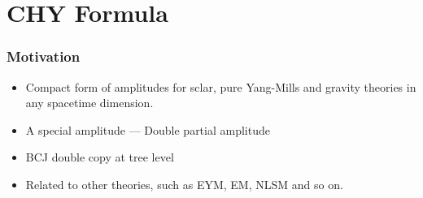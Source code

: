 \documentclass{beamer}
\begin{document}
\section{CHY Formula}
\begin{frame}
    \frametitle{Motivation}
    \begin{itemize}
        \item Compact form of amplitudes for sclar, pure Yang-Mills and gravity theories in any spacetime dimension.
        \item A special amplitude --- Double partial amplitude
        \item BCJ double copy at tree level
        \item Related to other theories, such as EYM, EM, NLSM and so on.
    \end{itemize}
\end{frame}
\end{document}
